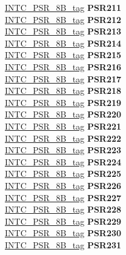 \begin{DoxyCompactItemize}
\begin{tabbing}
\>\>\mbox{\hyperlink{unionINTC__PSR__8B__tag}{INTC\_PSR\_8B\_tag}} {\bfseries PSR211}\\
\>\>\mbox{\hyperlink{unionINTC__PSR__8B__tag}{INTC\_PSR\_8B\_tag}} {\bfseries PSR212}\\
\>\>\mbox{\hyperlink{unionINTC__PSR__8B__tag}{INTC\_PSR\_8B\_tag}} {\bfseries PSR213}\\
\>\>\mbox{\hyperlink{unionINTC__PSR__8B__tag}{INTC\_PSR\_8B\_tag}} {\bfseries PSR214}\\
\>\>\mbox{\hyperlink{unionINTC__PSR__8B__tag}{INTC\_PSR\_8B\_tag}} {\bfseries PSR215}\\
\>\>\mbox{\hyperlink{unionINTC__PSR__8B__tag}{INTC\_PSR\_8B\_tag}} {\bfseries PSR216}\\
\>\>\mbox{\hyperlink{unionINTC__PSR__8B__tag}{INTC\_PSR\_8B\_tag}} {\bfseries PSR217}\\
\>\>\mbox{\hyperlink{unionINTC__PSR__8B__tag}{INTC\_PSR\_8B\_tag}} {\bfseries PSR218}\\
\>\>\mbox{\hyperlink{unionINTC__PSR__8B__tag}{INTC\_PSR\_8B\_tag}} {\bfseries PSR219}\\
\>\>\mbox{\hyperlink{unionINTC__PSR__8B__tag}{INTC\_PSR\_8B\_tag}} {\bfseries PSR220}\\
\>\>\mbox{\hyperlink{unionINTC__PSR__8B__tag}{INTC\_PSR\_8B\_tag}} {\bfseries PSR221}\\
\>\>\mbox{\hyperlink{unionINTC__PSR__8B__tag}{INTC\_PSR\_8B\_tag}} {\bfseries PSR222}\\
\>\>\mbox{\hyperlink{unionINTC__PSR__8B__tag}{INTC\_PSR\_8B\_tag}} {\bfseries PSR223}\\
\>\>\mbox{\hyperlink{unionINTC__PSR__8B__tag}{INTC\_PSR\_8B\_tag}} {\bfseries PSR224}\\
\>\>\mbox{\hyperlink{unionINTC__PSR__8B__tag}{INTC\_PSR\_8B\_tag}} {\bfseries PSR225}\\
\>\>\mbox{\hyperlink{unionINTC__PSR__8B__tag}{INTC\_PSR\_8B\_tag}} {\bfseries PSR226}\\
\>\>\mbox{\hyperlink{unionINTC__PSR__8B__tag}{INTC\_PSR\_8B\_tag}} {\bfseries PSR227}\\
\>\>\mbox{\hyperlink{unionINTC__PSR__8B__tag}{INTC\_PSR\_8B\_tag}} {\bfseries PSR228}\\
\>\>\mbox{\hyperlink{unionINTC__PSR__8B__tag}{INTC\_PSR\_8B\_tag}} {\bfseries PSR229}\\
\>\>\mbox{\hyperlink{unionINTC__PSR__8B__tag}{INTC\_PSR\_8B\_tag}} {\bfseries PSR230}\\
\>\>\mbox{\hyperlink{unionINTC__PSR__8B__tag}{INTC\_PSR\_8B\_tag}} {\bfseries PSR231}\\

\end{tabbing}
\end{DoxyCompactItemize}
